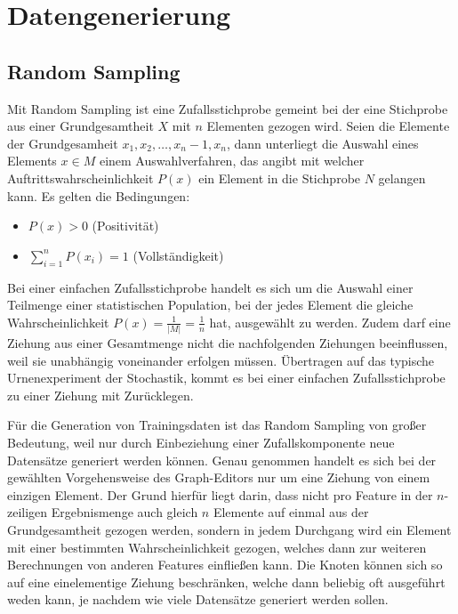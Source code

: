 
\chapter{Datengenerierung}

\section{Random Sampling}

Mit Random Sampling ist eine Zufallsstichprobe gemeint bei der eine Stichprobe aus einer Grundgesamtheit $X$ mit $n$ Elementen gezogen wird. Seien die Elemente der Grundgesamheit $x_1,x_2,\dots,x_n-1,x_n$, dann unterliegt die Auswahl eines Elements $x \in M$ einem Auswahlverfahren, das angibt mit welcher Auftrittswahrscheinlichkeit $P(x)$ ein Element in die Stichprobe $N$ gelangen kann.
Es gelten die Bedingungen:
\begin{itemize}
    \item $P(x) > 0$ (Positivität)
    \item $\sum_{i=1}^{n}P(x_i)=1$ (Vollständigkeit)
\end{itemize}

Bei einer einfachen Zufallsstichprobe handelt es sich um die Auswahl einer Teilmenge einer statistischen Population, bei der jedes Element die gleiche Wahrscheinlichkeit $P(x)=\frac{1}{\lvert M \rvert}=\frac{1}{n}$ hat, ausgewählt zu werden. Zudem darf eine Ziehung aus einer Gesamtmenge nicht die nachfolgenden Ziehungen beeinflussen, weil sie unabhängig voneinander erfolgen müssen. Übertragen auf das typische Urnenexperiment der Stochastik, kommt es bei einer einfachen Zufallsstichprobe zu einer Ziehung mit Zurücklegen.

Für die Generation von Trainingsdaten ist das Random Sampling von großer Bedeutung, weil nur durch Einbeziehung einer Zufallskomponente neue Datensätze generiert werden können. Genau genommen handelt es sich bei der gewählten Vorgehensweise des Graph-Editors nur um eine Ziehung von einem einzigen Element. Der Grund hierfür liegt darin, dass nicht pro Feature in der $n$-zeiligen Ergebnismenge auch gleich $n$ Elemente auf einmal aus der Grundgesamtheit gezogen werden, sondern in jedem Durchgang wird ein Element mit einer bestimmten Wahrscheinlichkeit gezogen, welches dann zur weiteren Berechnungen von anderen Features einfließen kann. Die Knoten können sich so auf eine einelementige Ziehung beschränken, welche dann beliebig oft ausgeführt weden kann, je nachdem wie viele Datensätze generiert werden sollen.

